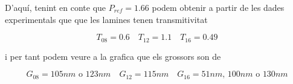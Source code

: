 \documentclass[12pt, a4papre]{article}
\begin{document}
	D'aquí, tenint en conte que $P_{ref} = 1.66$ podem obtenir a partir de les dades experimentals que que les lamines tenen transmitivitat
	
	\[
		T_{08} = 0.6 \quad T_{12} = 1.1 \quad T_{16} = 0.49
	\]
	
	i per tant podem veure a la grafica que els grossors son de 
	
	\[
		G_{08} = 105nm\text{ o }123nm \quad G_{12} = 115nm \quad G_{16} = 51nm\text{, }100nm\text{ o }130nm
	\]
	
	
	
\end{document}
